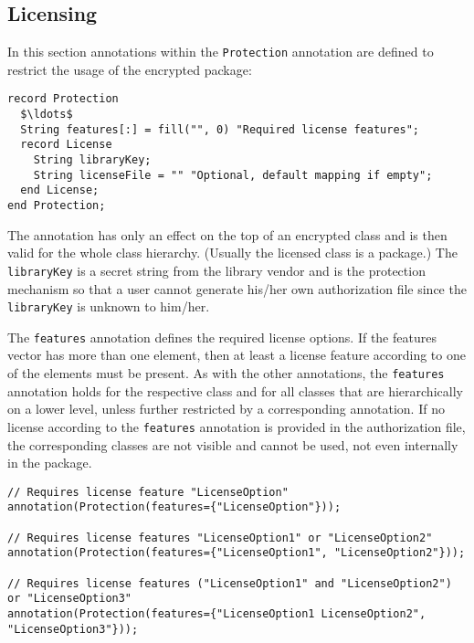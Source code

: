 \subsection{Licensing}\label{licensing}

In this section annotations within the \lstinline!Protection! annotation are defined to restrict the usage of the encrypted package:
\begin{lstlisting}[language=modelica]
record Protection
  $\ldots$
  String features[:] = fill("", 0) "Required license features";
  record License
    String libraryKey;
    String licenseFile = "" "Optional, default mapping if empty";
  end License;
end Protection;
\end{lstlisting}
The  annotation has only an effect on the top of an encrypted class and is then valid for the whole class hierarchy.
(Usually the licensed class is a package.)
The \lstinline!libraryKey! is a secret string from the library vendor and is the protection mechanism so that a user cannot generate his/her own authorization file since the \lstinline!libraryKey! is unknown to him/her.

The \lstinline!features! annotation defines the required license options.
If the features vector has more than one element, then at least a license feature according to one of the elements must be present.
As with the other annotations, the \lstinline!features! annotation holds for the respective class and for all classes that are hierarchically on a lower level, unless further restricted by a corresponding annotation.
If no license according to the \lstinline!features! annotation is provided in the authorization file, the corresponding classes are not visible and cannot be used, not even internally in the package.

\begin{example}
\begin{lstlisting}[language=modelica]
// Requires license feature "LicenseOption"
annotation(Protection(features={"LicenseOption"}));

// Requires license features "LicenseOption1" or "LicenseOption2"
annotation(Protection(features={"LicenseOption1", "LicenseOption2"}));

// Requires license features ("LicenseOption1" and "LicenseOption2") or "LicenseOption3"
annotation(Protection(features={"LicenseOption1 LicenseOption2", "LicenseOption3"}));
\end{lstlisting}
\end{example}

